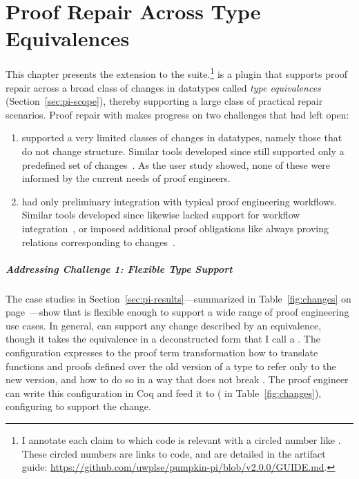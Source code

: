 \chapter{Proof Repair Across Type Equivalences}
\label{chapt:pi}


This chapter presents the \intro{\toolnamec} extension to the    suite.\footnote{I annotate each claim to which code is relevant with a circled number like . These circled numbers are links to code, and are detailed in the artifact guide: \url{https://github.com/uwplse/pumpkin-pi/blob/v2.0.0/GUIDE.md}.}
\toolnamec is a plugin that supports proof repair across a broad class of changes in datatypes called 
\textit{type equivalences} (Section~\ref{sec:pi-scope}),
thereby supporting a large class of practical repair scenarios.
Proof repair  with \toolnamec makes progress on two challenges that  had left open:

\begin{enumerate}
\item \sysname supported a very limited classes of changes in datatypes, namely those that do not change structure.
Similar tools developed since still supported only a predefined set of changes~\cite{robert2018, wibergh2019}.
As the  user study showed, none of these were informed by the current needs of proof engineers. %
\item \sysname had only preliminary integration with typical proof engineering workflows.
Similar tools developed since likewise lacked support for workflow integration~\cite{PGL-045, robert2018},
or imposed additional proof obligations like always proving relations corresponding to changes~\cite{tabareau2019marriage}.
\end{enumerate}

\paragraph{Addressing Challenge 1: Flexible Type Support}
The case studies in Section~\ref{sec:pi-results}---summarized in Table~\ref{fig:changes} on page~\pageref{fig:changes}---show that \toolnamec is flexible enough to support
a wide range of proof engineering use cases. %
In general, \toolnamec can support any change described by an equivalence, though it takes the equivalence in a
deconstructed form that I call a .
The configuration expresses to the proof term transformation how to translate functions and proofs defined over the old version of a type
to refer only to the new version, and how to do so in a way that does not break .
The proof engineer can write this configuration in Coq and feed it to \toolnamec ( in Table~\ref{fig:changes}),
configuring \toolnamec to support the change. %

